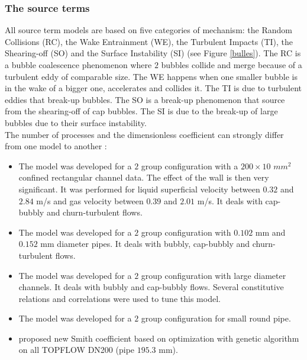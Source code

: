 \subsubsection{The source terms}
All source term models are based on five categories of mechanism: the Random Collisions (RC), the Wake Entrainment (WE), the Turbulent Impacts (TI), the Shearing-off (SO) and the Surface Instability (SI) (see Figure \ref{bulles}). The RC is a bubble coalescence phenomenon where $2$ bubbles collide and merge because of a turbulent eddy of comparable size. The WE happens when one smaller bubble is in the wake of a bigger one, accelerates and collides it. The TI is due to turbulent eddies that break-up bubbles. The SO is a break-up phenomenon that source from the shearing-off of cap bubbles. The SI is due to the break-up of large bubbles due to their surface instability.\\
The number of processes and the dimensionless coefficient can strongly differ from one model to another :
\begin{itemize}
\item[\small \textcolor{blue}{\ding{109}}] The \cite{SUN2} model was developed for a $2$ group configuration with a $200 \times  10$ $mm^2$ confined rectangular channel data. The effect of the wall is then very significant. It was performed for liquid superficial velocity between $0.32$ and $2.84$ m/s and gas velocity between $0.39$ and $2.01$ m/s. It deals with cap-bubbly and churn-turbulent flows.\\
\item[\small \textcolor{blue}{\ding{109}}] The \cite{Smith1} model was developed for a $2$ group configuration with $0.102$ mm and $0.152$ mm diameter pipes. It deals with bubbly, cap-bubbly and churn-turbulent flows. \\
\item[\small \textcolor{blue}{\ding{109}}] The \cite{Schlegel1} model was developed for a $2$ group configuration with large diameter channels. It deals with bubbly and cap-bubbly flows. Several constitutive relations and correlations were used to tune this model.\\
\item[\small \textcolor{blue}{\ding{109}}] The \cite{Fu2002} model was developed for a $2$ group configuration for small round pipe.\\
\item[\small \textcolor{blue}{\ding{109}}] \cite{Dave2016a} proposed new Smith coefficient based on optimization with genetic algorithm on all TOPFLOW DN200 (pipe $195.3$ mm).
\end{itemize}
